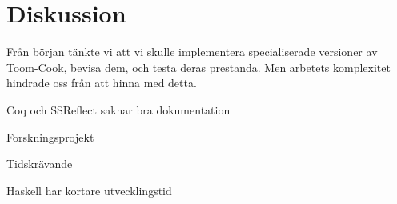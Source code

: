 \section{Diskussion}
Från början tänkte vi att vi skulle implementera specialiserade versioner av
Toom-Cook, bevisa dem, och testa deras prestanda. Men arbetets komplexitet
hindrade oss från att hinna med detta.

Coq och SSReflect saknar bra dokumentation

Forskningsprojekt

Tidskrävande

Haskell har kortare utvecklingstid
